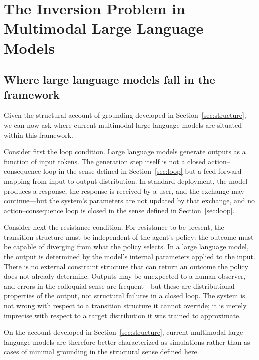 \documentclass[11pt]{article}
\begin{document}
\section{The Inversion Problem in Multimodal Large Language Models}
\label{sec:llm}

\subsection{Where large language models fall in the framework}
\label{sec:llm-location}

Given the structural account of grounding developed in
Section~\ref{sec:structure}, we can now ask where current multimodal
large language models are situated within this framework.

Consider first the loop condition. Large language models generate
outputs as a function of input tokens. The generation step itself is
not a closed action--consequence loop in the sense defined in
Section~\ref{sec:loop} but a feed-forward mapping from input to output
distribution. In standard deployment, the model
produces a response, the response is received by a user, and the
exchange may continue---but the system's parameters are not updated
by that exchange, and no action--consequence loop is closed in the
sense defined in Section~\ref{sec:loop}.

Consider next the resistance condition. For resistance to be present,
the transition structure must be independent of the agent's policy:
the outcome must be capable of diverging from what the policy selects.
In a large language model, the output is determined by the model's
internal parameters applied to the input. There is no external
constraint structure that can return an outcome the policy does not
already determine. Outputs may be unexpected to a human observer, and
errors in the colloquial sense are frequent---but these are
distributional properties of the output, not structural failures in a
closed loop. The system is not wrong with respect to a transition
structure it cannot override; it is merely imprecise with respect to a
target distribution it was trained to approximate.

On the account developed in Section~\ref{sec:structure}, current
multimodal large language models are therefore better characterized as
simulations rather than as cases of minimal grounding in the
structural sense defined here.
\end{document}
